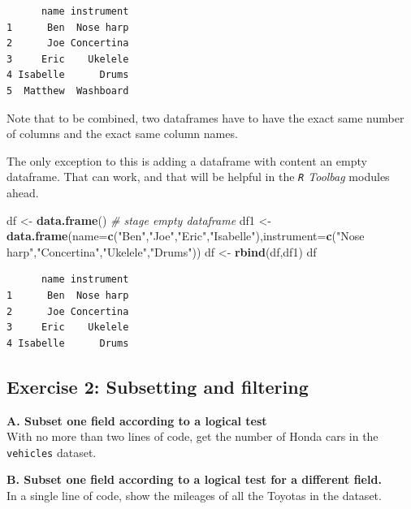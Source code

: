 \documentclass[
]{book}
\newenvironment{Shaded}{\begin{snugshade}}{\end{snugshade}}
\newcommand{\CommentTok}[1]{\textcolor[rgb]{0.56,0.35,0.01}{\textit{#1}}}
\newcommand{\DataTypeTok}[1]{\textcolor[rgb]{0.13,0.29,0.53}{#1}}
\newcommand{\KeywordTok}[1]{\textcolor[rgb]{0.13,0.29,0.53}{\textbf{#1}}}
\newcommand{\NormalTok}[1]{#1}
\newcommand{\StringTok}[1]{\textcolor[rgb]{0.31,0.60,0.02}{#1}}
\begin{document}
\begin{verbatim}
      name instrument
1      Ben  Nose harp
2      Joe Concertina
3     Eric    Ukelele
4 Isabelle      Drums
5  Matthew  Washboard
\end{verbatim}

Note that to be combined, two dataframes have to have the exact same number of columns and the exact same column names.

The only exception to this is adding a dataframe with content an empty dataframe. That can work, and that will be helpful in the \emph{\texttt{R} Toolbag} modules ahead.

\begin{Shaded}
\begin{Highlighting}[]
\NormalTok{df <-}\StringTok{ }\KeywordTok{data.frame}\NormalTok{() }\CommentTok{# stage empty dataframe}
\NormalTok{df1 <-}\StringTok{ }\KeywordTok{data.frame}\NormalTok{(}\DataTypeTok{name=}\KeywordTok{c}\NormalTok{(}\StringTok{"Ben"}\NormalTok{,}\StringTok{"Joe"}\NormalTok{,}\StringTok{"Eric"}\NormalTok{,}\StringTok{"Isabelle"}\NormalTok{),}\DataTypeTok{instrument=}\KeywordTok{c}\NormalTok{(}\StringTok{"Nose harp"}\NormalTok{,}\StringTok{"Concertina"}\NormalTok{,}\StringTok{"Ukelele"}\NormalTok{,}\StringTok{"Drums"}\NormalTok{))}
\NormalTok{df <-}\StringTok{ }\KeywordTok{rbind}\NormalTok{(df,df1)}
\NormalTok{df}
\end{Highlighting}
\end{Shaded}

\begin{verbatim}
      name instrument
1      Ben  Nose harp
2      Joe Concertina
3     Eric    Ukelele
4 Isabelle      Drums
\end{verbatim}

\hypertarget{exercise-2-subsetting-and-filtering}{%
\subsection*{Exercise 2: Subsetting and filtering}\label{exercise-2-subsetting-and-filtering}}

\textbf{A. Subset one field according to a logical test}\\
With no more than two lines of code, get the number of Honda cars in the \texttt{vehicles} dataset.

\textbf{B. Subset one field according to a logical test for a different field.}\\
In a single line of code, show the mileages of all the Toyotas in the dataset.
\end{document}
